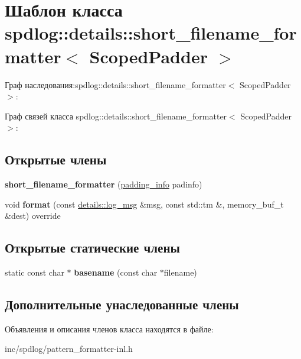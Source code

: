 \hypertarget{classspdlog_1_1details_1_1short__filename__formatter}{}\section{Шаблон класса spdlog\+:\+:details\+:\+:short\+\_\+filename\+\_\+formatter$<$ Scoped\+Padder $>$}
\label{classspdlog_1_1details_1_1short__filename__formatter}


Граф наследования\+:spdlog\+:\+:details\+:\+:short\+\_\+filename\+\_\+formatter$<$ Scoped\+Padder $>$\+:


Граф связей класса spdlog\+:\+:details\+:\+:short\+\_\+filename\+\_\+formatter$<$ Scoped\+Padder $>$\+:
\subsection*{Открытые члены}
\begin{DoxyCompactItemize}
\item 
\mbox{\label{classspdlog_1_1details_1_1short__filename__formatter_a61dc34f056dd558dd8b084f8eb0af0b7}} 
{\bfseries short\+\_\+filename\+\_\+formatter} (\hyperlink{structspdlog_1_1details_1_1padding__info}{padding\+\_\+info} padinfo)
\item 
\mbox{\label{classspdlog_1_1details_1_1short__filename__formatter_a8c0e11e5649ce92186badbaba2fba4c0}} 
void {\bfseries format} (const \hyperlink{structspdlog_1_1details_1_1log__msg}{details\+::log\+\_\+msg} \&msg, const std\+::tm \&, memory\+\_\+buf\+\_\+t \&dest) override
\end{DoxyCompactItemize}
\subsection*{Открытые статические члены}
\begin{DoxyCompactItemize}
\item 
\mbox{\label{classspdlog_1_1details_1_1short__filename__formatter_aaef83aa47d3b128551cb87b84d0e468d}} 
static const char $\ast$ {\bfseries basename} (const char $\ast$filename)
\end{DoxyCompactItemize}
\subsection*{Дополнительные унаследованные члены}


Объявления и описания членов класса находятся в файле\+:\begin{DoxyCompactItemize}
\item 
inc/spdlog/pattern\+\_\+formatter-\/inl.\+h\end{DoxyCompactItemize}
